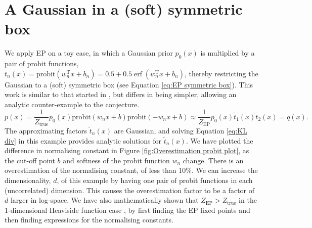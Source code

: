 \documentclass{article}
\DeclareMathOperator\erf{erf}
\begin{document}
\section{A Gaussian in a (soft) symmetric box}
%
We apply EP on a toy case, in which a Gaussian prior $p_0(x)$ is multiplied by a pair of probit functions, $t_n(x)=\text{probit}(w_n^\mathrm{T} x + b_n) = 0.5 + 0.5\erf{(w_n^\mathrm{T} x + b_n)}$, thereby restricting the Gaussian to a (soft) symmetric box (see Equation \ref{eq:EP symmetric box}). This work is similar to that started in \citet{cunningham_gaussian_2011}, but differs in being simpler, allowing an analytic counter-example to the conjecture.
%
\begin{equation} \label{eq:EP symmetric box}
    p(x) = \frac{1}{Z_\mathrm{true}}  p_0(x) \text{probit}(w_n x + b) \text{probit}(-w_n x + b)  \approx \frac{1}{Z_\mathrm{EP}}  p_0(x) \tilde{t}_1(x) \tilde{t}_2(x)  = q(x).
\end{equation}
%
The approximating factors $\tilde{t}_n(x)$ are Gaussian, and solving Equation \ref{eq:KL div} in this example provides analytic solutions for $\tilde{t}_n(x)$. We have plotted the difference in normalising constant in Figure \ref{fig:Overestimation probit plot}, as the cut-off point $b$ and softness of the probit function $w_n$ change. There is an overestimation of the normalising constant, of less than 10\%. We can increase the dimensionality, $d$, of this example by having one pair of probit functions in each (uncorrelated) dimension. This causes the overestimation factor to be a factor of $d$ larger in log-space. We have also mathematically shown that $Z_\mathrm{EP}>Z_\mathrm{true}$ in the 1-dimensional Heaviside function case \citep{swaroop_understanding_2017}, by first finding the EP fixed points and then finding expressions for the normalising constants.
%
%
%
\end{document}
